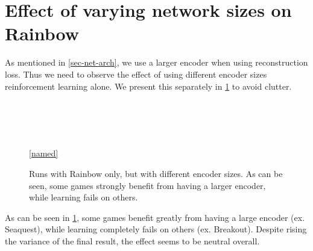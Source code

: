 


\section{Effect of varying network sizes on Rainbow}
\label{sec-effectiveness-of-cont-updating}
As mentioned in \ref{sec-net-arch}, we use a larger encoder when using
reconstruction loss. Thus we need to observe the effect of using
different encoder sizes reinforcement learning alone.
We present this separately in \ref{fig:big-vs-small-enc-rl-only} to avoid clutter.

\begin{figure}[!t]
  \captionsetup[subfloat]{position=top,labelformat=empty}
  \centering

    \subfloat[]{  \resizebox{0.4\textwidth}{!}{}}
    \subfloat[]{  \resizebox{0.4\textwidth}{!}{}}\\
  \vspace{-1cm}
    \subfloat[]{  \resizebox{0.4\textwidth}{!}{}}
    \subfloat[]{  \resizebox{0.4\textwidth}{!}{}}\\
  \vspace{-1cm}
    \subfloat[]{  \resizebox{0.4\textwidth}{!}{}}
    \subfloat[]{  \resizebox{0.4\textwidth}{!}{}}\\
  \vspace{-1cm}
    \subfloat[]{  \resizebox{0.4\textwidth}{!}{}}
    \\

    \ref{named}
  \caption{Runs with Rainbow only, but with different encoder sizes. As can be seen,
  some games strongly benefit from having a larger encoder, while learning
fails on others.}
  \label{fig:big-vs-small-enc-rl-only}
\end{figure}

As can be seen in \ref{fig:big-vs-small-enc-rl-only}, some games benefit greatly from
having a large encoder (ex. Seaquest), while learning completely fails on others 
(ex. Breakout).
Despite rising the variance of the final result, the effect seems to be neutral
overall.



